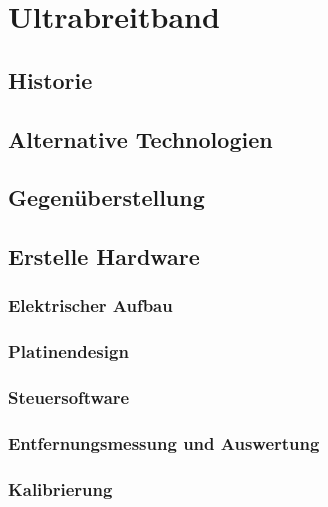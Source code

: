 \chapter{Ultrabreitband}

\section{Historie}

\section{Alternative Technologien}

\section{Gegenüberstellung}

\section{Erstelle Hardware}

\subsection{Elektrischer Aufbau}

\subsection{Platinendesign}

\subsection{Steuersoftware}

\subsection{Entfernungsmessung und Auswertung}

\subsection{Kalibrierung}